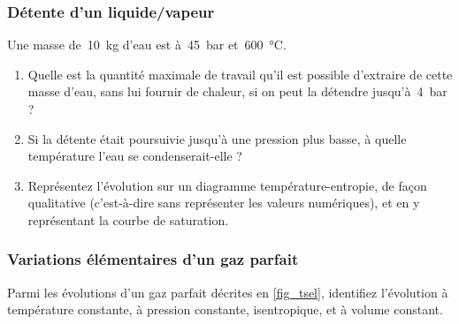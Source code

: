 \begin{boiboiboite}
	\propeau
	\propair
	\isentropiques
	\deltaentropie
\end{boiboiboite}

\subsubsection{Détente d’un liquide/vapeur}

	Une masse de~\SI{10}{\kilogram} d’eau est à~\SI{45}{\bar} et~\SI{600}{\degreeCelsius}.
	
	\begin{enumerate}
		\item Quelle est la quantité maximale de travail qu’il est possible d’extraire de cette masse d’eau, sans lui fournir de chaleur, si on peut la détendre jusqu’à~\SI{4}{\bar} ?
		\item Si la détente était poursuivie jusqu’à une pression plus basse, à quelle température l’eau se condenserait-elle ?
		\item Représentez l’évolution sur un diagramme température-entropie, de façon qualitative (c’est-à-dire sans représenter les valeurs numériques), et en y représentant la courbe de saturation.
	\end{enumerate}

\subsubsection{Variations élémentaires d’un gaz parfait}

	Parmi les évolutions d’un gaz parfait décrites en \cref{fig_tsel}, identifiez l’évolution à température constante, à pression constante, isentropique, et à volume constant.	
	

